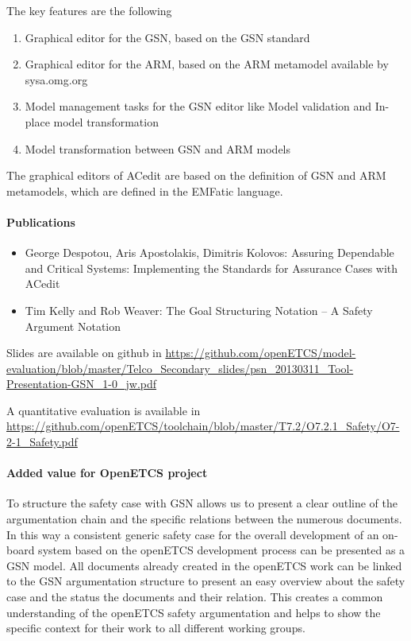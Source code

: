 The key features are the following
\begin{enumerate}
\item Graphical editor for the GSN, based on the GSN standard
\item Graphical editor for the ARM, based on the ARM metamodel available by sysa.omg.org
\item Model management tasks for the GSN editor like Model validation and In-place model transformation 
\item Model transformation between GSN and ARM models 
\end{enumerate}
    
The graphical editors of ACedit are based on the definition of GSN and ARM metamodels, which are defined in the EMFatic language.        

\paragraph{Publications}

\begin{itemize}
\item George Despotou, Aris Apostolakis, Dimitris Kolovos: Assuring Dependable and Critical Systems: Implementing the Standards for Assurance Cases with ACedit
\item Tim Kelly and Rob Weaver: The Goal Structuring Notation – A Safety Argument Notation 
\end{itemize}

Slides are available on github in 
\url{https://github.com/openETCS/model-evaluation/blob/master/Telco_Secondary_slides/psn_20130311_Tool-Presentation-GSN_1-0_jw.pdf}

A quantitative evaluation is available in 
\url{https://github.com/openETCS/toolchain/blob/master/T7.2/O7.2.1_Safety/O7-2-1_Safety.pdf}

\paragraph{Added value for OpenETCS project}

To structure the safety case with GSN allows us to present a clear outline of the argumentation chain and the specific relations between the numerous documents. In this way a consistent generic safety case for the overall development of an on-board system based on the openETCS development process can be presented as a GSN model. All documents already created in the openETCS work can be linked to the GSN argumentation structure to present an easy overview about the safety case and the status the documents and their relation. This creates a common understanding of the openETCS safety argumentation and helps to show the specific context for their work to all different working groups. 

